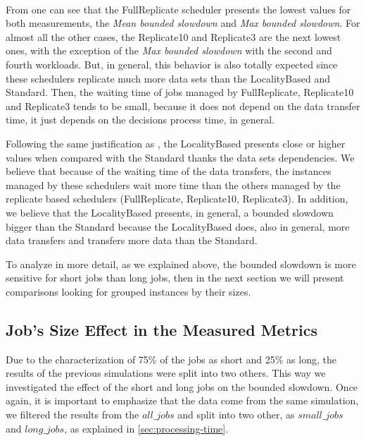\\
From  one can see that the FullReplicate scheduler presents the lowest values for both measurements, the \textit{Mean bounded slowdown} and \textit{Max bounded slowdown}. For almost all the other cases, the Replicate10 and Replicate3 are the next lowest ones, with the exception of the \textit{Max bounded slowdown} with the second and fourth workloads.
But, in general, this behavior is also totally expected since these schedulers replicate much more data sets than the LocalityBased and Standard. Then, the waiting time of jobs managed by FullReplicate, Replicate10 and Replicate3 tends to be small, because it does not depend on the data transfer time, it just depends on the decisions process time, in general.

Following the same justification as , the LocalityBased presents close or higher values when compared with the Standard thanks the data sets dependencies.
We believe that because of the waiting time of the data transfers, the instances managed by these schedulers wait more time than the others managed by the replicate based schedulers (FullReplicate, Replicate10, Replicate3).
In addition, we believe that the LocalityBased presents, in general, a bounded slowdown bigger than the Standard because the LocalityBased does, also in general, more data transfers and transfers more data than the Standard.

To analyze in more detail, as we explained above, the bounded slowdown is more sensitive for short jobs than long jobs, then in the next section we will present comparisons looking for grouped instances by their sizes.

\subsection{Job's Size Effect in the Measured Metrics}

Due to the characterization of 75\% of the jobs as short and 25\% as long, the results of the previous simulations were split into two others. 
This way we investigated the effect of the short and long jobs on the bounded slowdown. Once again, it is important to emphasize that the data come from the same simulation, we filtered the results from the $all\_jobs$ and split into two other, as $small\_jobs$ and $long\_jobs$, as explained in \cref{sec:processing-time}.


